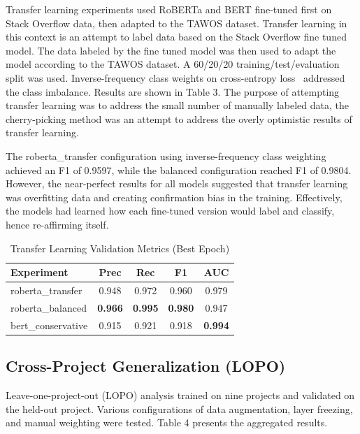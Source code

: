\documentclass[preprint,12pt]{elsarticle}
\begin{document}
Transfer learning experiments used RoBERTa and BERT fine-tuned first on Stack Overflow data, then adapted to the TAWOS dataset. Transfer learning in this context is an attempt to label data based on the Stack Overflow fine tuned model. The data labeled by the fine tuned model was then used to adapt the model according to the TAWOS dataset. A 60/20/20 training/test/evaluation split was used. Inverse-frequency class weights on cross-entropy loss~\cite{mao2023} addressed the class imbalance. Results are shown in Table 3. The purpose of attempting transfer learning was to address the small number of manually labeled data, the cherry-picking method was an attempt to address the overly optimistic results of transfer learning.

The roberta\_transfer configuration using inverse-frequency class weighting achieved an F1 of 0.9597, while the balanced configuration reached F1 of 0.9804. However, the near-perfect results for all models suggested that transfer learning was overfitting data and creating confirmation bias in the training. Effectively, the models had learned how each fine-tuned version would label and classify, hence re-affirming itself.

\begin{table}[t]
\centering
\label{tab:transfer}
\begin{tabular}{lcccc}
\toprule
\textbf{Experiment} & \textbf{Prec} & \textbf{Rec} & \textbf{F1} & \textbf{AUC} \\
\midrule
roberta\_transfer & 0.948 & 0.972 & 0.960 & 0.979 \\
roberta\_balanced & \textbf{0.966} & \textbf{0.995} & \textbf{0.980} & 0.947 \\
bert\_conservative & 0.915 & 0.921 & 0.918 & \textbf{0.994} \\
\bottomrule
\end{tabular}
\caption{Transfer Learning Validation Metrics (Best Epoch)}
\end{table}

\subsection{Cross-Project Generalization (LOPO)}

Leave-one-project-out (LOPO) analysis trained on nine projects and validated on the held-out project. Various configurations of data augmentation, layer freezing, and manual weighting were tested. Table 4 presents the aggregated results.
\end{document}
